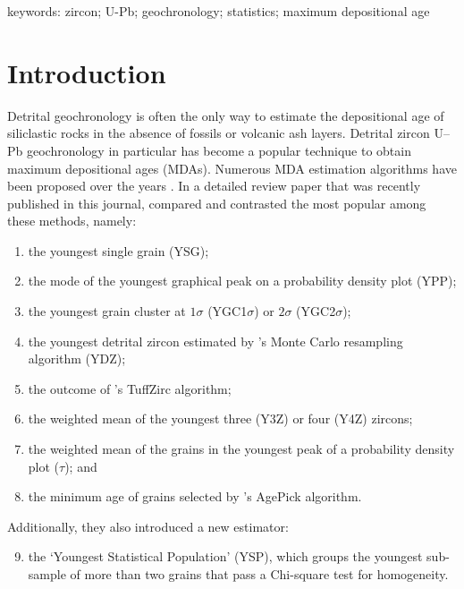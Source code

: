 \documentclass{article}
\begin{document}
\begin{center}
  keywords: zircon; U-Pb; geochronology; statistics; maximum depositional age
\end{center}

\section{Introduction}

Detrital geochronology is often the only way to estimate the
depositional age of siliclastic rocks in the absence of fossils or
volcanic ash layers. Detrital zircon U--Pb geochronology in particular
has become a popular technique to obtain maximum depositional ages
(MDAs). Numerous MDA estimation algorithms have been proposed over the
years \citep{nelson2001, barbeau2009, dickinson2009, tucker2013,
  chen2016, zhang2016, ross2017, herriott2019, copeland2020}. In a
detailed review paper that was recently published in this journal,
\citet{coutts2019} compared and contrasted the most popular among
these methods, namely:

\begin{enumerate}
\item the youngest single grain (YSG);
\item the mode of the youngest graphical peak on a probability density
  plot (YPP);
\item the youngest grain cluster at $1\sigma$ (YGC1$\sigma$) or
  $2\sigma$ (YGC2$\sigma$);
\item the youngest detrital zircon estimated by \citet{ludwig2003}'s
  Monte Carlo resampling algorithm (YDZ);
\item the outcome of \citet{ludwig2002}'s TuffZirc algorithm;
\item the weighted mean of the youngest three (Y3Z) or four (Y4Z)
  zircons;
\item the weighted mean of the grains in the youngest peak of a
  probability density plot ($\tau$); and
\item the minimum age of grains selected by \citet{gehrels2003}'s
  AgePick algorithm.
\end{enumerate}

\noindent Additionally, they also introduced a new estimator:

\begin{enumerate}
  \setcounter{enumi}{8}
\item the `Youngest Statistical Population' (YSP), which groups the
  youngest sub-sample of more than two grains that pass a Chi-square
  test for homogeneity.
\end{enumerate}
\end{document}
